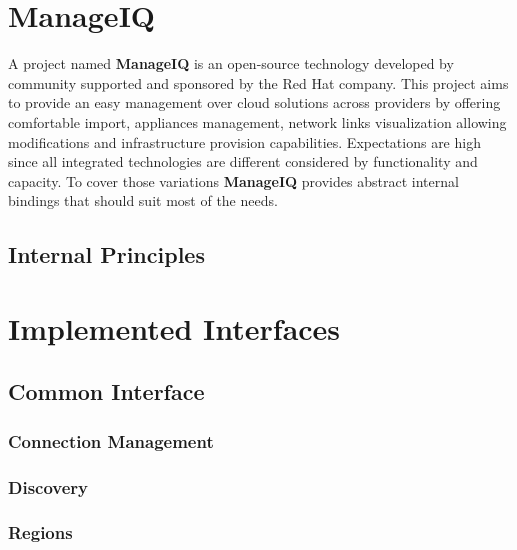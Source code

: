 \chapter{ManageIQ}
\label{chap:ManageIQ}

A project named \textbf{ManageIQ} is an open-source technology developed by community supported and sponsored by the Red Hat company. This project aims to provide an easy management over cloud solutions across providers by offering comfortable import, appliances management, network links visualization allowing modifications and infrastructure provision capabilities. Expectations are high since all integrated technologies are different considered by functionality and capacity. To cover those variations \textbf{ManageIQ} provides abstract internal bindings that should suit most of the needs.

\section{Internal Principles}
\label{sec:Internal Principles}



\chapter{Implemented Interfaces}
\label{chap:Implemented Interfaces}


\section{Common Interface}
\label{sec:Common Interface}


\subsection{Connection Management}
\label{sub:Connection Management}


\subsection{Discovery}
\label{sub:Discovery}



\subsection{Regions}
\label{sub:Regions}

